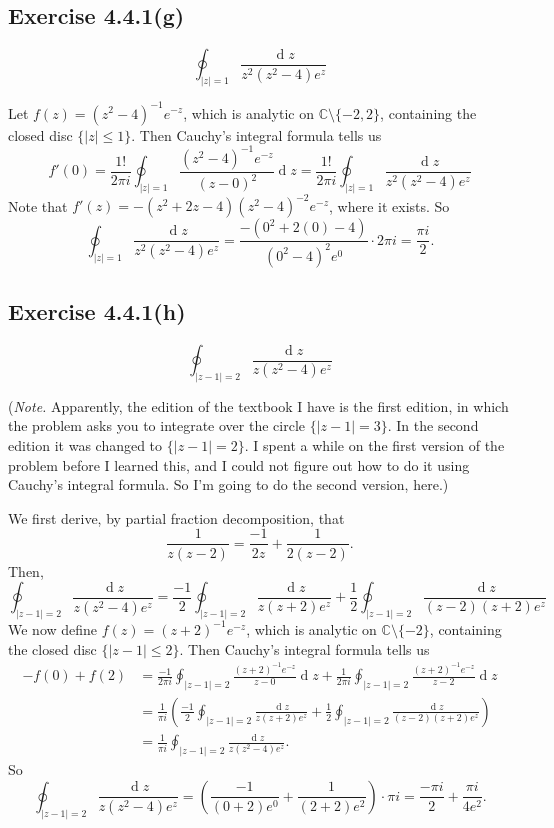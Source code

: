 \documentclass[12pt]{article}
\newenvironment{problem}
    {\begin{lrbox}{\mybox}\begin{minipage}{0.98\textwidth}}
    {\end{minipage}\end{lrbox}\framebox[\textwidth]{\usebox{\mybox}}}
\newcommand{\C}{\mathbb{C}} %
\newcommand{\<}{\left\langle} %
\renewcommand{\>}{\right\rangle} %
\renewcommand{\d}[1]{\operatorname{d}\!#1} %
\begin{document}
\subsection{Exercise 4.4.1(g)}
\begin{problem}
    \[\oint_{|z| = 1} \frac{ \d{z}}{z^2 (z^2 - 4) e^z}\]
\end{problem}
\medskip

Let $f(z) = (z^2 - 4)^{-1}e^{-z}$, which is analytic on $\C \setminus \{-2, 2\}$, containing the closed disc $\{|z| \leq 1\}$. Then Cauchy's integral formula tells us
\[
    f'(0) = \frac{1!}{2 \pi i} \oint_{|z| = 1} \frac{(z^2 - 4)^{-1}e^{-z}}{(z - 0)^2} \d{z} = \frac{1!}{2 \pi i} \oint_{|z| = 1} \frac{ \d{z}}{z^2 (z^2 - 4) e^z}
\]
Note that $f'(z) = -(z^2 + 2z - 4)(z^2 - 4)^{-2} e^{-z}$, where it exists. So
\[
    \oint_{|z| = 1} \frac{ \d{z}}{z^2 (z^2 - 4) e^z} = \frac{-(0^2 + 2(0) - 4)}{(0^2 - 4)^2 e^0} \cdot 2 \pi i = \frac{\pi i}{2}.
\]

\newpage
\subsection{Exercise 4.4.1(h)}
\begin{problem}
    \[\oint_{|z - 1| = 2} \frac{ \d{z}}{z (z^2 - 4) e^z}\]
\end{problem}
\medskip

(\emph{Note.} Apparently, the edition of the textbook I have is the first edition, in which the problem asks you to integrate over the circle $\{|z - 1| = 3\}$. In the second edition it was changed to $\{|z - 1| = 2\}$. I spent a while on the first version of the problem before I learned this, and I could not figure out how to do it using Cauchy's integral formula. So I'm going to do the second version, here.)
\medskip

We first derive, by partial fraction decomposition, that
\[
    \frac{1}{z(z - 2)} = \frac{-1}{2z} + \frac{1}{2(z - 2)}.
\]
Then,
\[
    \oint_{|z - 1| = 2} \frac{ \d{z}}{z (z^2 - 4) e^z} = \frac{-1}{2} \oint_{|z - 1| = 2} \frac{ \d{z}}{z (z + 2) e^z} + \frac{1}{2} \oint_{|z - 1| = 2} \frac{ \d{z}}{(z - 2)(z + 2) e^z}
\]
We now define $f(z) = (z + 2)^{-1}e^{-z}$, which is analytic on $\C \setminus \{-2\}$, containing the closed disc $\{|z - 1| \leq 2\}$. Then Cauchy's integral formula tells us
\begin{align*}
    -f(0) + f(2)
        &= \frac{-1}{2 \pi i} \oint_{|z - 1| = 2} \frac{(z + 2)^{-1}e^{-z}}{z - 0} \d{z} + \frac{1}{2 \pi i} \oint_{|z - 1| = 2} \frac{(z + 2)^{-1}e^{-z}}{z - 2} \d{z} \\[1em]
        &= \frac{1}{\pi i} \left( \frac{-1}{2} \oint_{|z - 1| = 2} \frac{ \d{z}}{z (z + 2) e^z} + \frac{1}{2} \oint_{|z - 1| = 2} \frac{ \d{z}}{(z - 2)(z + 2) e^z} \right) \\[1em]
        &= \frac{1}{\pi i} \oint_{|z - 1| = 2} \frac{ \d{z}}{z (z^2 - 4) e^z}.
\end{align*}
So
\[
    \oint_{|z - 1| = 2} \frac{ \d{z}}{z (z^2 - 4) e^z} = \left( \frac{-1}{(0 + 2)e^0} + \frac{1}{(2 + 2)e^2} \right) \cdot \pi i = \frac{- \pi i}{2} + \frac{\pi i}{4 e^2}.
\]
\end{document}
